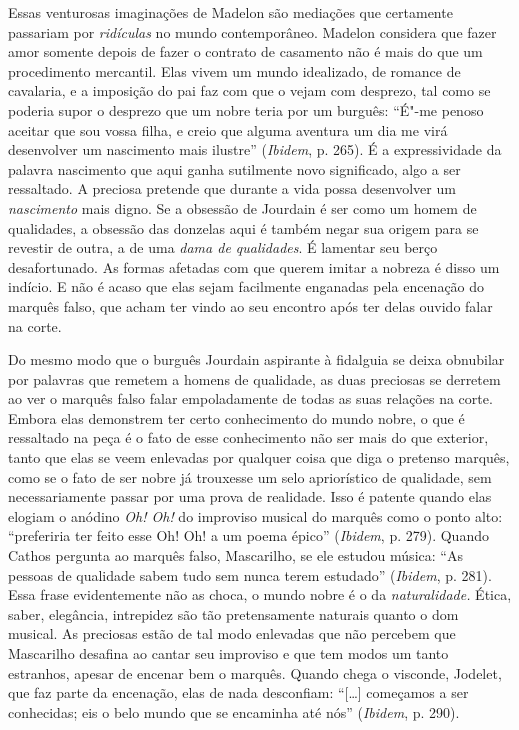 Essas venturosas imaginações de Madelon são mediações que certamente
passariam por \emph{ridículas} no mundo contemporâneo. Madelon considera
que fazer amor somente depois de fazer o contrato de casamento não é
mais do que um procedimento mercantil. Elas vivem um mundo idealizado,
de romance de cavalaria, e a imposição do pai faz com que o vejam com
desprezo, tal como se poderia supor o desprezo que um nobre teria por um
burguês: ``É"-me penoso aceitar que sou vossa filha, e creio que alguma
aventura um dia me virá desenvolver um nascimento mais ilustre'' (\emph{Ibidem},
p. 265). É a expressividade da palavra nascimento que aqui ganha
sutilmente novo significado, algo a ser ressaltado. A preciosa pretende
que durante a vida possa desenvolver um \emph{nascimento} mais digno. Se
a obsessão de Jourdain é ser como um homem de qualidades, a obsessão das
donzelas aqui é também negar sua origem para se revestir de outra, a de
uma \emph{dama de qualidades}. É lamentar seu berço desafortunado. As
formas afetadas com que querem imitar a nobreza é disso um indício. E
não é acaso que elas sejam facilmente enganadas pela encenação do
marquês falso, que acham ter vindo ao seu encontro após ter delas ouvido
falar na corte.

Do mesmo modo que o burguês Jourdain aspirante à fidalguia se deixa
obnubilar por palavras que remetem a homens de qualidade, as duas
preciosas se derretem ao ver o marquês falso falar empoladamente de
todas as suas relações na corte. Embora elas demonstrem ter certo
conhecimento do mundo nobre, o que é ressaltado na peça é o fato de esse
conhecimento não ser mais do que exterior, tanto que elas se veem
enlevadas por qualquer coisa que diga o pretenso marquês, como se o fato
de ser nobre já trouxesse um selo apriorístico de qualidade, sem
necessariamente passar por uma prova de realidade. Isso é patente quando
elas elogiam o anódino \emph{Oh! Oh!} do improviso musical do marquês
como o ponto alto: ``preferiria ter feito esse Oh! Oh! a um poema
épico'' (\emph{Ibidem}, p. 279). Quando Cathos pergunta ao marquês
falso, Mascarilho, se ele estudou música: ``As pessoas de qualidade
sabem tudo sem nunca terem estudado'' (\emph{Ibidem}, p. 281). Essa
frase evidentemente não as choca, o mundo nobre é o da
\emph{naturalidade.} Ética, saber, elegância, intrepidez são tão
pretensamente naturais quanto o dom musical. As preciosas estão
de tal modo enlevadas que não percebem que Mascarilho desafina ao cantar
seu improviso e que tem modos um tanto estranhos, apesar de encenar bem
o marquês. Quando chega o visconde, Jodelet, que faz parte da encenação,
elas de nada desconfiam: ``[\ldots{}] começamos a ser conhecidas; eis o
belo mundo que se encaminha até nós'' (\emph{Ibidem}, p. 290).

